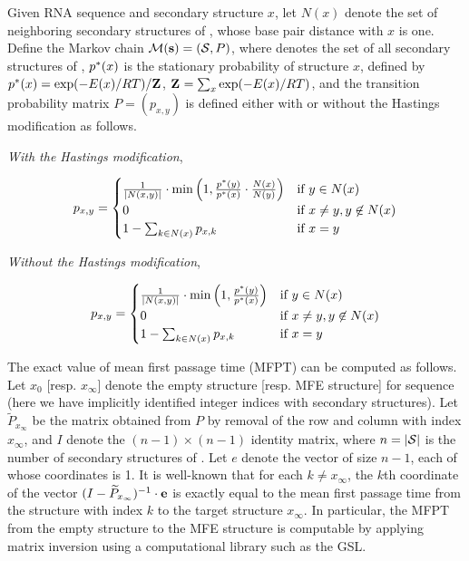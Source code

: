 Given RNA sequence \seq and secondary structure $x$,
let $N(x)$ denote the set of neighboring secondary structures of
\seq, whose base pair distance with $x$ is one. Define the Markov
chain $\mathcal{M}({\bf s})=(\mathcal S,P)$, where \str denotes the
set of all secondary structures of \seq, $p^*(x)$ is the stationary
probability of structure $x$, defined by $p^*(x)=\exp(-E(x)/RT)/{\bf Z}^{}_{}$,
${\bf Z}^{}_{}=\sum_{x} \exp(-E(x)/RT)$, and the transition probability matrix $P
= (p_{x,y})$ is defined either with or without the Hastings
modification as follows.

{\em With the Hastings modification},

\begin{align}
\label{eq:hermes:xitionProbWithHastings}
p_{x,y}=
\begin{cases}
\frac{1}{|N(x,y)|} \cdot \min\left(1, \frac{\pSt(y)}{\pSt(x)} \cdot
\frac{N(x)}{N(y)}\right) & \text{if $y \in N(x)$} \\
0 &\text{if $x \ne y, y \not\in N(x)$} \\
1 - \sum_{k \in N(x)} p_{x,k} & \text{if $x=y$} \\
\end{cases}
\end{align}

{\em Without the Hastings modification},

\begin{align}
\label{eq:hermes:xitionProbWithoutHastings}
p_{x,y}=
\begin{cases}
\frac{1}{|N(x,y)|} \cdot \min\left(1, \frac{\pSt(y)}{\pSt(x)}\right)
& \text{if $y \in N(x)$} \\
0 &\text{if $x \ne y, y \not\in N(x)$} \\
1 - \sum_{k \in N(x)} p_{x,k} & \text{if $x=y$} \\
\end{cases}
\end{align}

The exact value of mean first passage time (MFPT) can be computed as
follows. Let $x_0$ [resp. $x_{\infty}$] denote the empty structure
[resp. MFE structure] for sequence \seq (here we have implicitly
identified integer indices with secondary structures). Let
$\widetilde{P}_{x_{\infty}}$ be the matrix obtained from $P$ by
removal of the row and column with index $x_{\infty}$, and $I$ denote
the $(n-1)\times(n-1)$ identity matrix, where $n=|\mathcal S|$ is the
number of secondary structures of \seq. Let $e$ denote the vector of
size $n-1$, each of whose coordinates is 1. It is well-known
\citep{meyermfpt} that for each $k\ne x_{\infty}$, the $k$th coordinate
of the vector $(I - \widetilde{P}_{x_{\infty}})^{-1} \cdot {\bf e}$ is
exactly equal to the mean first passage time from the structure with
index $k$ to the target structure $x_{\infty}$. In particular, the
MFPT from the empty structure to the MFE structure is computable by
applying matrix inversion using a computational library such as the GSL.

